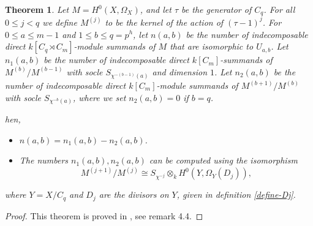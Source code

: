 \documentclass[11pt,letterpaper]{amsart}
\newtheorem{theorem}{Theorem}
\theoremstyle{definition}
\begin{document}

\begin{theorem}
    \label{th:21}
Let $M=H^0(X,\Omega_X)$, and let $\tau$ be the generator of $C_q$. For all $0\leq j < q$ we define
$M^{(j)}$ to be the kernel of the action 
{of $(\tau-1)^j$.} 
For $0\leq a \leq m-1$ and $1\leq b \leq q=p^h$, let $n(a,b)$ be the number of indecomposable 
direct $k[C_q \rtimes C_m]$-module summands of $M$ that are isomorphic to $U_{a,b}$. 
Let $n_1(a,b)$ be the number of indecomposable direct $k[C_m]$-summands of $M^{(b)}/M^{(b-1)}$ with socle $S_{\chi^{-(b-1)}(a)}$ and dimension $1$. Let $n_2(a,b)$ be the number of indecomposable
direct $k[C_m]$-module summands of $M^{(b+1)}/M^{(b)}$ with socle $S_{\chi^{-b}(a)}$, where 
we set $n_2(a,b)=0$ if $b=q$. 
{hen, 
\begin{itemize}
\item
$n(a,b)=n_1(a,b)-n_2(a,b)$. 
\item The numbers $n_1(a,b),n_2(a,b)$ can be computed using the isomorphism 
\[
M^{(j+1)}/M^{(j)}\cong S_{\chi^{-j}} \otimes_k H^0(Y,\Omega_Y(D_j)), 
\]
\end{itemize} 
}
where $Y=X/C_q$ and $D_j$ are the divisors on $Y$, given in definition \ref{define-Dj}.

\end{theorem}
\begin{proof}
This theorem is proved in \cite{MR4130074}, see remark 4.4.
\end{proof}


\end{document}
